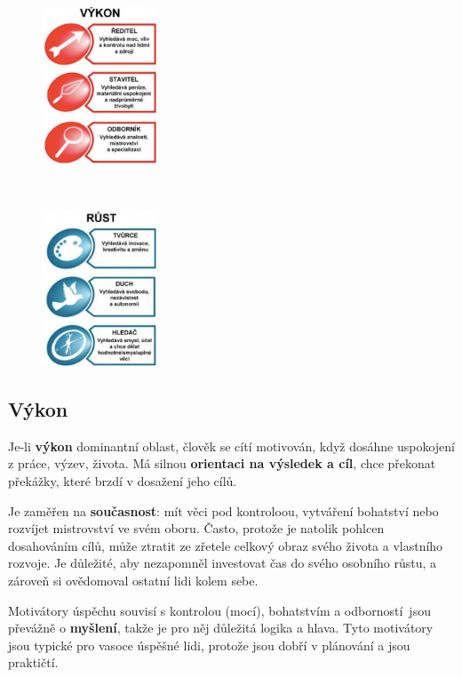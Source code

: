 \documentclass[a4paper,12pt]{report}
\begin{document}
\begin{figure}
\includegraphics[width=0.3\textwidth]{zdroje/motivace-vykon.png}

\

\includegraphics[width=0.3\textwidth]{zdroje/motivace-rust.png}
\end{figure}
\subsection[Výkon]{Výkon}

\pagelogos
Je-li \textbf{výkon} dominantní oblast, člověk se cítí motivován, když dosáhne uspokojení z práce, výzev, života. Má silnou \textbf{orientaci na výsledek a cíl}, chce překonat překážky, které brzdí v dosažení jeho cílů.

Je zaměřen na \textbf{současnost}: mít věci pod kontroloou, vytváření bohatství nebo rozvíjet mistrovství ve svém oboru. Často, protože je natolik pohlcen dosahováním cílů, může ztratit ze zřetele celkový obraz svého života a vlastního rozvoje. Je důležité, aby nezapomněl investovat čas do svého osobního růstu, a zároveň si ovědomoval ostatní lidi kolem sebe.

Motivátory úspěchu souvisí s kontrolou (mocí), bohatstvím a odborností\ jsou převážně o \textbf{myšlení}, takže je pro něj důležitá logika a hlava. Tyto motivátory jsou typické pro vasoce úspěšné lidi, protože jsou dobří v plánování a jsou praktičtí.
\end{document}
